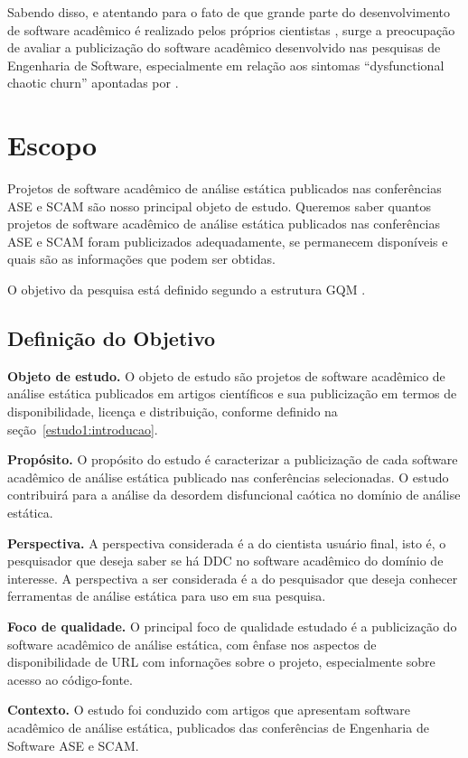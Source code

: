 Sabendo disso, e atentando para o fato de que grande parte do desenvolvimento
de software acadêmico é realizado pelos próprios cientistas
\cite{hettrick2014uk, momcheva2015software}, surge a preocupação de avaliar 
a publicização do software acadêmico desenvolvido nas pesquisas de Engenharia de
Software, especialmente em relação aos sintomas ``dysfunctional chaotic churn''
apontadas por .


\section{Escopo} \label{estudo1:escopo} %

Projetos de software acadêmico de análise estática publicados nas 
conferências ASE e SCAM 
são nosso principal objeto de estudo.
Queremos saber quantos projetos de software acadêmico de análise estática publicados
nas conferências ASE e SCAM foram publicizados adequadamente, se permanecem disponíveis e 
quais são as informações que podem ser obtidas.

O objetivo da pesquisa está definido segundo a estrutura GQM \cite{basili1994goal}.

\subsection{Definição do Objetivo}

\begin{description}
  \item{\bf Objeto de estudo.}
     O objeto de estudo são projetos de software acadêmico de análise estática
     publicados em artigos científicos e sua publicização em termos de
     disponibilidade, licença e distribuição, conforme definido na
     seção~\ref{estudo1:introducao}.
  \item{\bf Propósito.}
    O propósito do estudo é caracterizar a publicização de cada software
    acadêmico de análise estática publicado nas conferências selecionadas.
    O estudo contribuirá para a análise da desordem disfuncional caótica no
    domínio de análise estática.
  \item{\bf Perspectiva.}
    A perspectiva considerada é a do cientista usuário final, isto é, o
    pesquisador que deseja saber se há DDC no software acadêmico do domínio de
    interesse. A perspectiva a ser considerada é a do pesquisador que deseja
    conhecer ferramentas de análise estática para uso em sua pesquisa.
  \item{\bf Foco de qualidade.}
    O principal foco de qualidade estudado é a publicização do software
    acadêmico de análise estática, com ênfase nos aspectos de disponibilidade
    de URL com infornações sobre o projeto, especialmente sobre acesso ao
    código-fonte.
  \item{\bf Contexto.}
    O estudo foi conduzido com artigos que apresentam software acadêmico de
    análise estática, publicados das conferências de Engenharia de Software ASE
    e SCAM.
\end{description}

